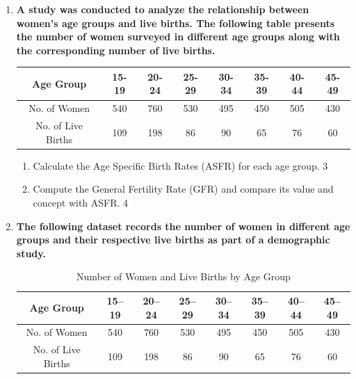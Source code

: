 \documentclass[a4paper,oneside]{book}
\begin{document}
\begin{enumerate}
  \begin{enumerate}
    \item
	What is the formula of death rate? \hfill 1
    \item
	Write down the uses of vital statistics. \hfill 2
    \item  
	Find teh Age Specific Birth Rates (ASFR). \hfill 3
    \item
	Find the GFR and compare its concept and value with ASFRs. \hfill 4
  \end{enumerate}
  
  \item
\textbf{A study was conducted to analyze the relationship between women's age groups and live births. The following table presents the number of women surveyed in different age groups along with the corresponding number of live births.} 

\begin{table}[H]
\centering
\begin{tabular}{c|c|c|c|c|c|c|c}
Age Group & 15-19 & 20-24 & 25-29 & 30-34 & 35-39 & 40-44 & 45-49 \\ \hline
No. of Women & 540 & 760 & 530 & 495 & 450 & 505 & 430 \\  \hline
No. of Live Births & 109 & 198 & 86 & 90 & 65 & 76 & 60
\end{tabular}
\end{table}


\begin{enumerate}
    \item
    Calculate the Age Specific Birth Rates (ASFR) for each age group. \hfill 3

    \item
    Compute the General Fertility Rate (GFR) and compare its value and concept with ASFR. \hfill 4
\end{enumerate}

\item
\textbf{The following dataset records the number of women in different age groups and their respective live births as part of a demographic study.} 

\begin{table}[H]
\centering
\begin{tabular}{c|c|c|c|c|c|c|c}
Age Group & 15--19 & 20--24 & 25--29 & 30--34 & 35--39 & 40--44 & 45--49 \\ \hline
No. of Women & 540 & 760 & 530 & 495 & 450 & 505 & 430 \\  \hline
No. of Live Births & 109 & 198 & 86 & 90 & 65 & 76 & 60
\end{tabular}
\caption{Number of Women and Live Births by Age Group}
\end{table}



\end{enumerate}
\end{document}
